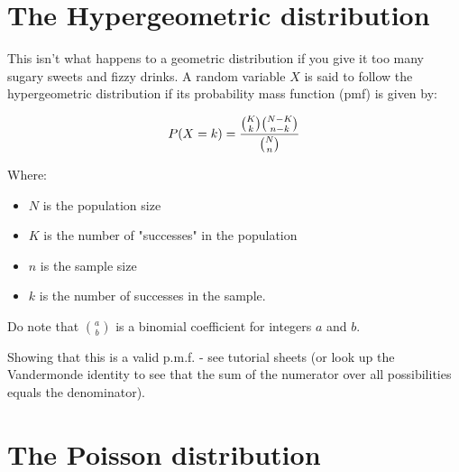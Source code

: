 \documentclass[12pt]{extbook}
\begin{document}







\section{The Hypergeometric distribution}

This isn't what happens to a geometric distribution if you give it too many sugary sweets and fizzy drinks.   A random variable $X$ is said to follow the hypergeometric distribution if its probability mass function (pmf) is given by:

$$P(X=k) = {{{K \choose k} {{N-K} \choose {n-k}}}\over {N \choose n}}$$

Where:
\begin{itemize}
\item    $N$ is the population size
\item $K$ is the number of "successes" in the population
\item $n$ is the sample size
\item $k$ is the number of successes in the sample.
\end{itemize}
Do note that ${a \choose b}$ is a binomial coefficient for integers $a$ and $b$.


Showing that this is a valid p.m.f. - see tutorial sheets (or look up the Vandermonde identity to see that the sum of the numerator over all possibilities equals the denominator).




\section{The Poisson distribution}
\end{document}
